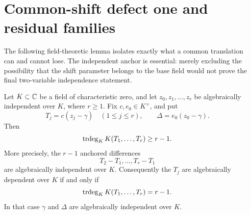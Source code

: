 \section{Common-shift defect one and residual families}
\label{sec:common-shift-residuals}

The following field-theoretic lemma isolates exactly what a common
translation can and cannot lose.  The independent anchor is essential: merely
excluding the possibility that the shift parameter belongs to the base field
would not prove the final two-variable independence statement.

\begin{theorem}
\label{thm:common-shift-defect}
Let \(K\subset\mathbb C\) be a field of characteristic zero, and let
\(z_0,z_1,\ldots,z_r\) be algebraically independent over \(K\), where
\(r\geq1\).  Fix \(c,e_0\in K^\times\), and put
\begin{equation}\label{eq:common-shift-coordinates}
 T_j=c(z_j-\gamma)\quad(1\leq j\leq r),
 \qquad
 \Delta=e_0(z_0-\gamma).
\end{equation}
Then
\begin{equation}\label{eq:common-shift-lower-bound}
 \operatorname{trdeg}_K K(T_1,\ldots,T_r)\geq r-1.
\end{equation}
More precisely, the \(r-1\) anchored differences
\[
 T_2-T_1,\ldots,T_r-T_1
\]
are algebraically independent over \(K\).  Consequently the \(T_j\) are
algebraically dependent over \(K\) if and only if
\[
 \operatorname{trdeg}_K K(T_1,\ldots,T_r)=r-1.
\]
In that case \(\gamma\) and \(\Delta\) are algebraically independent over
\(K\).
\end{theorem}


